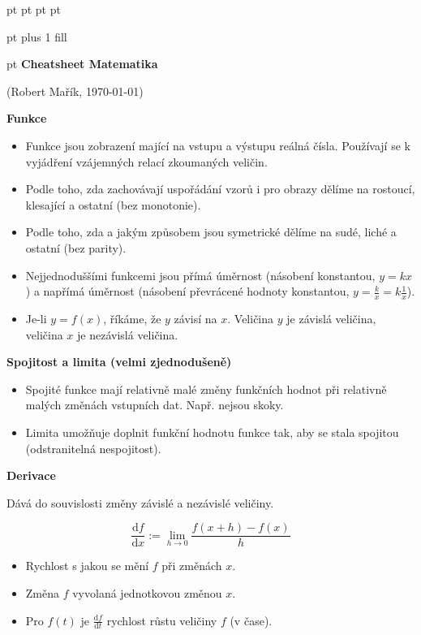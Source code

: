 \documentclass{article}
\begin{document}
 pt
 pt
\let\phi\varphi
\footnotesize
{} pt
 pt
\begin{multicols}{3}
 pt plus 1 fill

{\centering {} pt
\textbf{Cheatsheet Matematika}

(Robert Mařík, \today)

}

\textbf{Funkce}
\vspace*{-\baselineskip}
\begin{itemize}
\item Funkce jsou zobrazení mající na vstupu a výstupu reálná čísla. Používají se k vyjádření vzájemných relací zkoumaných veličin.
\item Podle  toho, zda zachovávají uspořádání vzorů i pro obrazy dělíme na rostoucí, klesající a ostatní (bez monotonie).
\item Podle toho, zda a jakým způsobem jsou symetrické dělíme na sudé, liché a ostatní (bez parity).
\item Nejjednoduššími funkcemi jsou přímá úměrnost (násobení konstantou, $y=kx$) a napřímá úměrnost (násobení převrácené hodnoty konstantou, $y=\frac kx=k\frac 1x$).
\item Je-li $y=f(x)$, říkáme, že $y$ závisí na $x$. Veličina $y$ je závislá veličina, veličina $x$ je nezávislá veličina.
\end{itemize}

\textbf{Spojitost a limita (velmi zjednodušeně)}
\vspace*{-\baselineskip}
\begin{itemize}
\item Spojité funkce mají relativně malé změny funkčních hodnot při relativně malých změnách vstupních dat. Např. nejsou skoky.
\item Limita umožňuje doplnit funkční hodnotu funkce tak, aby se stala spojitou (odstranitelná nespojitost).
\end{itemize}

\textbf{Derivace}
\vspace*{-\baselineskip}

Dává do souvislosti změny závislé a nezávislé veličiny. 

$$\frac{\mathrm df}{\mathrm dx}:=\lim_{h\to 0}\frac{f(x+h)-f(x)}{h}$$

\begin{itemize}
\item Rychlost s jakou se mění $f$ při změnách $x$.
\item Změna $f$ vyvolaná jednotkovou změnou $x$.
\item Pro $f(t)$ je $\frac{\mathrm df}{\mathrm dt}$ rychlost růstu veličiny $f$ (v čase).
\end{itemize}


\end{multicols}
\end{document}
